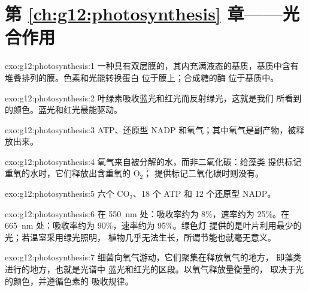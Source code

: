 \section*{第 \ref{ch:g12:photosynthesis} 章——光合作用}

\begin{solution}{exo:g12:photosynthesis:1}
一种具有双层膜的，其内充满液态的基质，基质中含有
堆叠排列的膜。色素和光能转换蛋白
位于膜上；合成糖的酶
位于基质中。
\end{solution}

\begin{solution}{exo:g12:photosynthesis:2}
叶绿素吸收蓝光和红光而反射绿光，这就是我们
所看到的颜色。蓝光和红光最能驱动。
\end{solution}

\begin{solution}{exo:g12:photosynthesis:3}
ATP、还原型 NADP 和氧气；其中氧气是副产物，被释放出来。
\end{solution}

\begin{solution}{exo:g12:photosynthesis:4}
氧气来自被分解的水，而非二氧化碳：给藻类
提供标记重氧的水时，它们释放出含重氧的 $\mathrm{O_2}$；
提供标记二氧化碳时则没有。
\end{solution}

\begin{solution}{exo:g12:photosynthesis:5}
六个 $\mathrm{CO_2}$、18 个 ATP 和 12 个还原型 NADP。
\end{solution}

\begin{solution}{exo:g12:photosynthesis:6}
在 \qty{550}{nm} 处：吸收率约为 8\%，速率约为 25\%。在
\qty{665}{nm} 处：吸收率约为 90\%，速率约为 95\%。绿色灯
提供的是叶片利用最少的光；若温室采用绿光照明，
植物几乎无法生长，所谓节能也就毫无意义。
\end{solution}

\begin{solution}{exo:g12:photosynthesis:7}
细菌向氧气游动，它们聚集在释放氧气的地方，
即藻类进行的地方，也就是光谱中
蓝光和红光的区段。以氧气释放量衡量的，
取决于光的颜色，并遵循色素的
吸收规律。
\end{solution}

